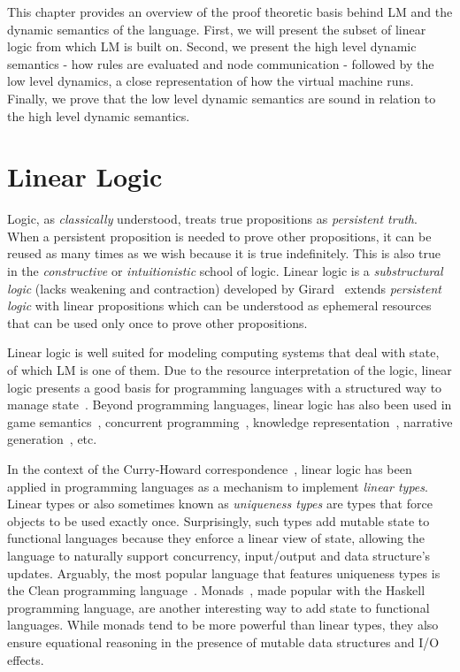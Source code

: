 This chapter provides an overview of the proof theoretic basis behind LM
and the dynamic semantics of the language. First, we will present the subset of
linear logic from which LM is built on. Second, we present the high level
dynamic semantics - how rules are evaluated and node communication - followed by
the low level dynamics, a close representation of how the virtual machine runs.
Finally, we prove that the low level dynamic semantics are sound in relation to
the high level dynamic semantics.

\section{Linear Logic}

Logic, as \emph{classically} understood, treats true propositions as
\emph{persistent truth}. When a persistent proposition is needed to prove other
propositions, it can be reused as many times as we wish because it is true
indefinitely. This is also true in the \emph{constructive} or
\emph{intuitionistic} school of logic.  Linear logic is a \emph{substructural
logic} (lacks weakening and contraction) developed by
Girard~\cite{Girard95logic:its} extends \emph{persistent logic} with linear
propositions which can be understood as ephemeral resources that can be used
only once to prove other propositions.

Linear logic is well suited for modeling computing systems that deal with state,
of which LM is one of them.  Due to the resource interpretation of the logic,
linear logic presents a good basis for programming languages with a structured
way to manage state~\cite{Miller85anoverview}. Beyond programming languages,
linear logic has also been used in game
semantics~\cite{lafont1991games,blass1992game}, concurrent
programming~\cite{lopez2005monadic,mazurak2010lolliproc,perez-2012}, knowledge
representation~\cite{bos2011survey}, narrative
generation~\cite{chris-int7,martens2013linear}, etc.

In the context of the Curry-Howard correspondence~\cite{howard:tfatnoc}, linear
logic has been applied in programming languages as a mechanism to implement
\emph{linear types}. Linear types or also sometimes known as \emph{uniqueness
types} are types that force objects to be used exactly once. Surprisingly, such
types add mutable state to functional languages because they enforce a linear
view of state, allowing the language to naturally support concurrency,
input/output and data structure's updates.  Arguably, the most popular language
that features uniqueness types is the Clean programming
language~\cite{JFP:1349748}.  Monads~\cite{Wadler:1997:DI:262009.262011}, made
popular with the Haskell programming language, are another interesting way to
add state to functional languages. While monads tend to be more powerful than
linear types, they also ensure equational reasoning in the presence of mutable
data structures and I/O effects.

